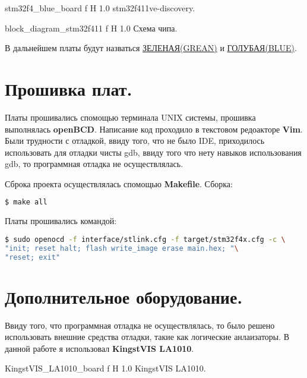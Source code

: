 \documentclass{bmstu}
\begin{document}
	{stm32f4_blue_board} %
	{f} %
	{H} %
	{1.0\textwidth} %
	{stm32f411ve-discovery.}
	
	{block_diagram_stm32f411} %
	{f} %
	{H} %
	{1.0\textwidth} %
	{Схема чипа.}
	
	В дальнейшем платы будут назваться \underline{ЗЕЛЕНАЯ(GREAN)} и \underline{ГОЛУБАЯ(BLUE)}.
	
	\section{Прошивка плат.}
	
	Платы прошивались спомощью терминала UNIX системы, прошивка выполнялась \textbf{openBCD}. Написание код проходило в текстовом редоакторе \textbf{Vim}.
	Были трудности с отладкой, ввиду того, что не было IDE, приходилось использовать для отладки чисты gdb, ввиду того что нету навыков использования gdb,
	то программная отладка не осуществлялась.
	
	Сброка проекта осуществлялась спомощью \textbf{Makefile}. Сборка:
	
	\begingroup
	\fontsize{12pt}{12pt}\selectfont
	\begin{lstlisting}[language=bash]
$ make all
	\end{lstlisting}
	\endgroup
	
	Платы прошивались командой:
	
	
	\begingroup
	\fontsize{12pt}{12pt}\selectfont
	\begin{lstlisting}[language=bash]
$ sudo openocd -f interface/stlink.cfg -f target/stm32f4x.cfg -c \
"init; reset halt; flash write_image erase main.hex; "\  
"reset; exit"
	\end{lstlisting}
	\endgroup
	
	\section{Дополнительное оборудование.}
	
	Ввиду того, что программная отладка не осуществлялась, то было решено использовать внешние средства отладки, такие как логические анлаизаторы. 
	В данной работе я использовал \textbf{KingstVIS LA1010}.
	
	{KingstVIS_LA1010_board} %
	{f} %
	{H} %
	{1.0\textwidth} %
	{KingstVIS LA1010.}
	
\end{document}
